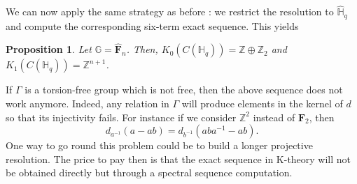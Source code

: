 \documentclass[a4paper, 11pt]{amsart}
\theoremstyle{plain}
\newtheorem{prop}[thm]{Proposition}
\theoremstyle{definition}
\theoremstyle{remark}
\newcommand{\F}{\mathbf{F}}
\newcommand{\G}{\mathbb{G}}
\newcommand{\HH}{\mathbb{H}}
\newcommand{\Z}{\mathbb{Z}}
\begin{document}
We can now apply the same strategy as before : we restrict the resolution to $\widehat{\HH}_{q}$ and compute the corresponding six-term exact sequence. This yields

\begin{prop}
Let $\G = \widehat{\F}_{n}$. Then, $K_{0}(C(\HH_{q})) = \Z\oplus \Z_{2}$ and $K_{1}(C(\HH_{q})) = \Z^{n+1}$.
\end{prop}

If $\Gamma$ is a torsion-free group which is not free, then the above sequence does not work anymore. Indeed, any relation in $\Gamma$ will produce elements in the kernel of $d$ so that its injectivity fails. For instance if we consider $\Z^{2}$ instead of $\F_{2}$, then
\begin{equation*}
d_{a^{-1}}(a - ab) = d_{b^{-1}}(aba^{-1} - ab).
\end{equation*}
One way to go round this problem could be to build a longer projective resolution. The price to pay then is that the exact sequence in K-theory will not be obtained directly but through a spectral sequence computation.



\end{document}
